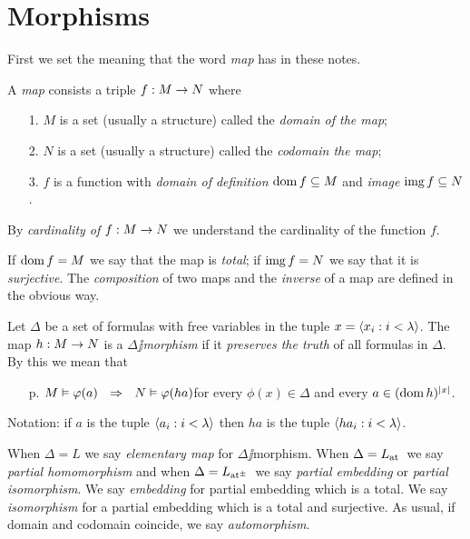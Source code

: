 \documentclass[creche.tex]{subfiles}
\begin{document}
\section{Morphisms}

\def\ceq#1#2#3{\parbox[b]{15ex}{$\displaystyle #1$}\parbox[b]{6ex}{\hfil$#2$}$\displaystyle #3$}

First we set the meaning that the word \emph{map\/} has in these notes.

\begin{definition}\label{defmappa}
A \emph{map\/} consists a triple $f:M\rightarrow N$ where 
\begin{itemize}
\item[1.] $M$ is a set (usually a structure) called the \emph{domain of the map};
\item[2.] $N$ is a set (usually a structure) called the \emph{codomain the map};
\item[3.] $f$ is a function with \emph{domain of definition\/} $\mathop{\rm dom} f\subseteq M$ and \emph{image} $\mathop{\rm img} f\subseteq N$.
\end{itemize}
By \emph{cardinality of $f:M\rightarrow N$\/} we understand the cardinality of the function $f$.\QED
\end{definition}

If $\mathop{\rm dom} f = M$ we say that the map is \emph{total}; if $\mathop{\rm img} f=N$ we say that it is \emph{surjective\/}. The \emph{composition\/} of two maps and the \emph{inverse\/} of a map are defined in the obvious way.

\begin{definition}\label{defpreservaveritas}
Let $\Delta$ be a set of formulas with free variables in the tuple $x=\langle x_i: i<\lambda\rangle$. The map $h:M\rightarrow N$ is a \emph{$\Delta\jj$morphism\/} if it  \emph{preserves the truth\/} of all formulas in $\Delta$. By this we mean that 
\begin{itemize}
\item[p.] $M\models\phi(a)\ \ \IMP\ \ N\models\phi(ha)$\hfill for every $\phi(x)\in\Delta$ and every $a\in(\mathop{\rm dom} h)^{|x|}$.
\end{itemize}
Notation: if $a$ is the tuple $\langle a_i: i<\lambda\rangle$ then $ha$ is the tuple $\langle ha_i: i<\lambda\rangle$.\QED
\end{definition}

When $\Delta=L$ we say \emph{elementary map\/} for $\Delta\jj$morphism. When  $\Delta=L_{\tiny\rm at}\hskip-.3ex\ $ we say  \emph{partial homomorphism\/} and when $\Delta=\atpmL\ $ we say \emph{partial embedding\/} or \emph{partial isomorphism}. We say \emph{embedding\/} for partial embedding which is a total. We say \emph{isomorphism\/} for a partial embedding which is a total and surjective. As usual, if domain and codomain coincide, we say \emph{automorphism}.
\end{document}

